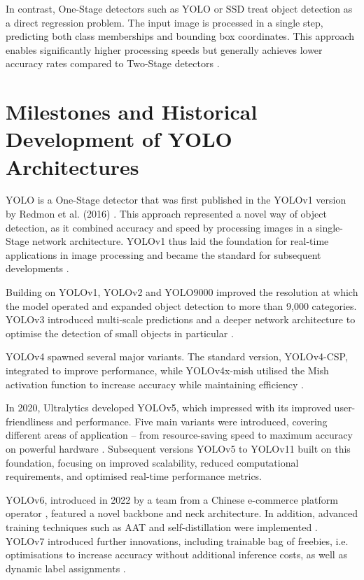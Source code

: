 In contrast, One-Stage detectors such as \Acrfull{YOLO} \cite{redmon2016} or \Acrfull{SSD} \cite{Liu_2016} treat object detection as a direct regression problem. The input image is processed in a single step, predicting both class memberships and bounding box coordinates. This approach enables significantly higher processing speeds but generally achieves lower accuracy rates compared to Two-Stage detectors \cite{Soviany2018}.



\section{Milestones and Historical Development of YOLO Architectures}
\label{sec:milestone_yolo}

\acrfull{YOLO} is a One-Stage detector that was first published in the YOLOv1 version by Redmon et al. (2016) \cite{redmon2016}. This approach represented a novel way of object detection, as it combined accuracy and speed by processing images in a single-Stage network architecture. YOLOv1 thus laid the foundation for real-time applications in image processing and became the standard for subsequent developments \cite{Sapkota2025}.

Building on YOLOv1, YOLOv2 and YOLO9000 \cite{Li2018,Nakahara2018} improved the resolution at which the model operated and expanded object detection to more than 9,000 categories. YOLOv3 introduced multi-scale predictions and a deeper network architecture to optimise the detection of small objects in particular \cite{Kim2018,yolov3_redmon}.

YOLOv4 spawned several major variants. The standard version, YOLOv4-CSP, integrated  to improve performance, while YOLOv4x-mish utilised the Mish activation function to increase accuracy while maintaining efficiency \cite{Nepal2022,Sozzi2022,Mohod2023}.

In 2020, Ultralytics developed YOLOv5, which impressed with its improved user-friendliness and performance. Five main variants were introduced, covering different areas of application – from resource-saving speed to maximum accuracy on powerful hardware \cite{Sapkota2025,ultralyics_2020}. Subsequent versions YOLOv5 to YOLOv11 built on this foundation, focusing on improved scalability, reduced computational requirements, and optimised real-time performance metrics.

YOLOv6, introduced in 2022 by a team from a Chinese e-commerce platform operator \cite{li2022}, featured a novel backbone and neck architecture. In addition, advanced training techniques such as \acrfull{AAT} and self-distillation were implemented \cite{Sapkota2025,li2022}. YOLOv7 \cite{wang2022,Wang2023} introduced further innovations, including trainable bag of freebies, i.e. optimisations to increase accuracy without additional inference costs, as well as dynamic label assignments \cite{wang2022,Wang2023,Sapkota2025}.

